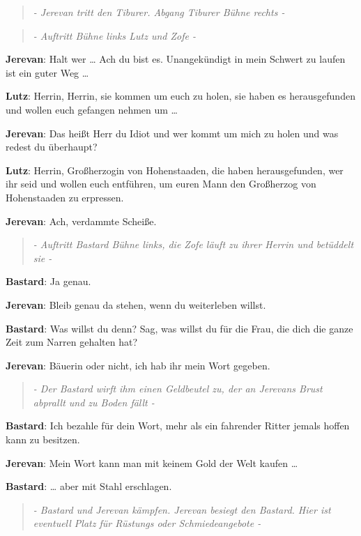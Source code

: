 \documentclass[a5paper,6pt]{book}
\begin{document}
\begin{quote}
  \textit{- Jerevan tritt den Tiburer. Abgang Tiburer Bühne rechts -
}
 \end{quote}

\begin{quote}
  \textit{- Auftritt Bühne links Lutz und Zofe -
}
 \end{quote}

\textbf{Jerevan}: Halt wer … Ach du bist es. Unangekündigt in mein Schwert zu laufen ist ein guter Weg …

\textbf{Lutz}: Herrin, Herrin, sie kommen um euch zu holen, sie haben es herausgefunden und wollen euch gefangen nehmen um …

\textbf{Jerevan}: Das heißt Herr du Idiot und wer kommt um mich zu holen und was redest du überhaupt?

\textbf{Lutz}: Herrin, Großherzogin von Hohenstaaden, die haben herausgefunden, wer ihr seid und wollen euch entführen, um euren Mann den Großherzog von Hohenstaaden zu erpressen.

\textbf{Jerevan}: Ach, verdammte Scheiße.

\begin{quote}
  \textit{- Auftritt Bastard Bühne links, die Zofe läuft zu ihrer Herrin und betüddelt sie -
}
 \end{quote}

\textbf{Bastard}: Ja genau.

\textbf{Jerevan}: Bleib genau da stehen, wenn du weiterleben willst.

\textbf{Bastard}: Was willst du denn? Sag, was willst du für die Frau, die dich die ganze Zeit zum Narren gehalten hat?

\textbf{Jerevan}: Bäuerin oder nicht, ich hab ihr mein Wort gegeben.

\begin{quote}
  \textit{- Der Bastard wirft ihm einen Geldbeutel zu, der an Jerevans Brust abprallt und zu Boden fällt -
}
 \end{quote}

\textbf{Bastard}: Ich bezahle für dein Wort, mehr als ein fahrender Ritter jemals hoffen kann zu besitzen.

\textbf{Jerevan}: Mein Wort kann man mit keinem Gold der Welt kaufen …

\textbf{Bastard}: … aber mit Stahl erschlagen.

\begin{quote}
  \textit{- Bastard und Jerevan kämpfen. Jerevan besiegt den Bastard. Hier ist eventuell Platz für Rüstungs oder Schmiedeangebote -
}
 \end{quote}
\end{document}
